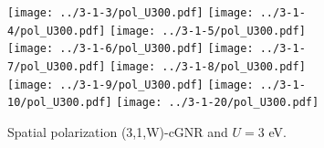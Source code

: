 \documentclass[twocolumn,amsmath,%
amssymb,prb,superscriptaddress]{revtex4}
\begin{document}
\begin{figure*}
	\texttt{[image: ../3-1-3/pol\_U300.pdf]}
	\texttt{[image: ../3-1-4/pol\_U300.pdf]}
	\texttt{[image: ../3-1-5/pol\_U300.pdf]}\\
	\texttt{[image: ../3-1-6/pol\_U300.pdf]}
	\texttt{[image: ../3-1-7/pol\_U300.pdf]}
	\texttt{[image: ../3-1-8/pol\_U300.pdf]}\\
	\texttt{[image: ../3-1-9/pol\_U300.pdf]}
	\texttt{[image: ../3-1-10/pol\_U300.pdf]}
	\texttt{[image: ../3-1-20/pol\_U300.pdf]}
	\caption{Spatial polarization (3,1,W)-cGNR and $U=3$ eV.} 
\end{figure*}
	

\end{document}
